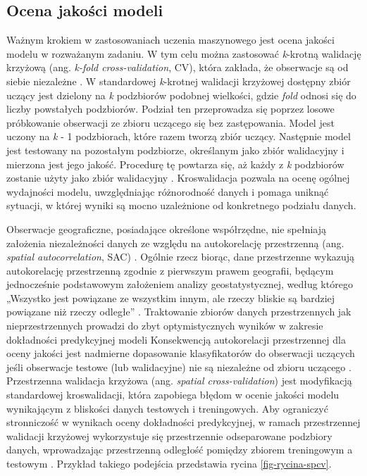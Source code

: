 \documentclass{amuthesis}
\begin{document}
\hypertarget{ocena-jakoux15bci-modeli}{%
\subsection{Ocena jakości modeli}\label{ocena-jakoux15bci-modeli}}

Ważnym krokiem w zastosowaniach uczenia maszynowego jest ocena jakości
modelu w rozważanym zadaniu. W tym celu można zastosować \emph{k}-krotną
walidację krzyżową (ang. \emph{k-fold cross-validation}, CV), która
zakłada, że obserwacje są od siebie niezależne
\autocite{pohjankukka_2017_scv}. W standardowej \emph{k}-krotnej
walidacji krzyżowej dostępny zbiór uczący jest dzielony na \emph{k}
podzbiorów podobnej wielkości, gdzie \emph{fold} odnosi się do liczby
powstałych podzbiorów. Podział ten przeprowadza się poprzez losowe
próbkowanie obserwacji ze zbioru uczącego się bez zastępowania. Model
jest uczony na \emph{k} - 1 podzbiorach, które razem tworzą zbiór
uczący. Następnie model jest testowany na pozostałym podzbiorze,
określanym jako zbiór walidacyjny i mierzona jest jego jakość. Procedurę
tę powtarza się, aż każdy z \emph{k} podzbiorów zostanie użyty jako
zbiór walidacyjny \autocite{berrar_2018_cv}. Kroswalidacja pozwala na
ocenę ogólnej wydajności modelu, uwzględniając różnorodność danych i
pomaga uniknąć sytuacji, w której wyniki są mocno uzależnione od
konkretnego podziału danych.

Obserwacje geograficzne, posiadające określone współrzędne, nie
spełniają założenia niezależności danych ze względu na autokorelację
przestrzenną (ang. \emph{spatial autocorrelation}, SAC)
\autocite{pohjankukka_2017_scv}. Ogólnie rzecz biorąc, dane przestrzenne
wykazują autokorelację przestrzenną zgodnie z pierwszym prawem
geografii, będącym jednocześnie podstawowym założeniem analizy
geostatystycznej, według którego „Wszystko jest powiązane ze wszystkim
innym, ale rzeczy bliskie są bardziej powiązane niż rzeczy odległe''
\autocite{tobler_1970_first_law_of_geography}. Traktowanie zbiorów
danych przestrzennych jak nieprzestrzennych prowadzi do zbyt
optymistycznych wyników w zakresie dokładności predykcyjnej modeli
\autocite{brenning_2005_scv} Konsekwencją autokorelacji przestrzennej
dla oceny jakości jest nadmierne dopasowanie klasyfikatorów do
obserwacji uczących jeśli obserwacje testowe (lub walidacyjne) nie są
niezależne od zbioru uczącego \autocite{brenning_2012_scv}. Przestrzenna
walidacja krzyżowa (ang. \emph{spatial cross-validation}) jest
modyfikacją standardowej kroswalidacji, która zapobiega błędom w ocenie
jakości modelu wynikającym z bliskości danych testowych i treningowych.
Aby ograniczyć stronniczość w wynikach oceny dokładności predykcyjnej, w
ramach przestrzennej walidacji krzyżowej wykorzystuje się przestrzennie
odseparowane podzbiory danych, wprowadzając przestrzenną odległość
pomiędzy zbiorem treningowym a testowym \autocite{pohjankukka_2017_scv}.
Przykład takiego podejścia przedstawia rycina \ref{fig-rycina-spcv}.
\end{document}
